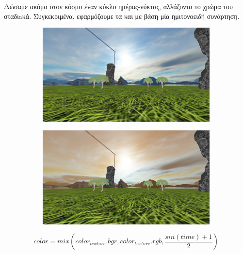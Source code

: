\documentclass[11pt]{scrartcl} %
\newenvironment{centerimg}[1]%
{%
    \begin{figure}[H]
        #1
    \begin{center}
}%
{%
    \end{center}
    \end{figure}
}
\begin{document}
Δώσαμε ακόμα στον κόσμο έναν κύκλο ημέρας-νύκτας, αλλάζοντα το χρώμα του  σταδιaκά. Συγκεκριμένα, 
εφαρμόζουμε   τα  και   με βάση μία ημιτονοειδή συνάρτηση.


\begin{centerimg}{\caption{Το  με χρώματα ημέρας και νύκτας.}}
    \begin{subfigure}[b]{0.5\textwidth}
        \includegraphics[width=\textwidth]{./assets/skybox_day.png}
    \end{subfigure}
    \begin{subfigure}[b]{0.5\textwidth}
        \includegraphics[width=\textwidth]{./assets/skybox_night.png}
    \end{subfigure}
\end{centerimg}

\begin{equation}
    color = mix(color_{texture}.bgr, color_{texture}.rgb, \frac{sin(time) + 1}{2})
\end{equation}
\end{document}
